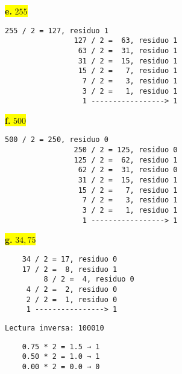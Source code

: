 \documentclass[a4paper,12pt]{article}
\begin{document}
		\begin{center}
			\colorbox{yellow}{{\textbf{e.} $255$}}
			\begin{Verbatim}[formatcom=\centering]
				255 / 2 = 127, residuo 1
				127 / 2 =  63, residuo 1
				 63 / 2 =  31, residuo 1
 				 31 / 2 =  15, residuo 1
				 15 / 2 =   7, residuo 1
				  7 / 2 =   3, residuo 1
				  3 / 2 =   1, residuo 1
				  1 -----------------> 1
			\end{Verbatim}
			\hspace{1.7cm}
		\end{center}
		\begin{center}
			\colorbox{yellow}{{\textbf{f.} $500$}}
			\begin{Verbatim}[formatcom=\centering]
				500 / 2 = 250, residuo 0
				250 / 2 = 125, residuo 0
				125 / 2 =  62, residuo 1
				 62 / 2 =  31, residuo 0
				 31 / 2 =  15, residuo 1
				 15 / 2 =   7, residuo 1
				  7 / 2 =   3, residuo 1
				  3 / 2 =   1, residuo 1
				  1 -----------------> 1
			\end{Verbatim}
			\hspace{1.7cm}
		\end{center}
		\begin{center}
			\colorbox{yellow}{{\textbf{g.} $34,75$}} \\ \vspace{0.3cm}
		\end{center}	
		\vspace{-1em}
		\begin{minipage}[t]{0.40\textwidth}
		\hspace{2,5cm}
		
\begin{Verbatim}
	34 / 2 = 17, residuo 0
	17 / 2 =  8, residuo 1
         8 / 2 =  4, residuo 0
	 4 / 2 =  2, residuo 0
	 2 / 2 =  1, residuo 0
	 1 ----------------> 1
\end{Verbatim}
		\hspace{1,5cm}\texttt{Lectura inversa: 100010}
		\end{minipage}
	\hfill
	\begin{minipage}[t]{0.40\textwidth}
	\hspace{2cm}
	
\begin{Verbatim}
	0.75 * 2 = 1.5 → 1 
	0.50 * 2 = 1.0 → 1 
	0.00 * 2 = 0.0 → 0 
\end{Verbatim}
	\end{minipage}
\begin{center}
\hspace{2cm}
\end{center}
\end{document}
